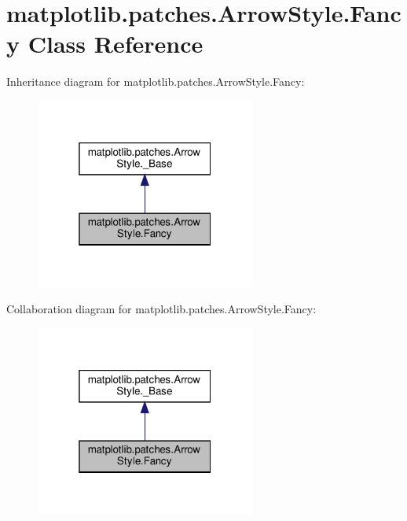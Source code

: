 \hypertarget{classmatplotlib_1_1patches_1_1ArrowStyle_1_1Fancy}{}\section{matplotlib.\+patches.\+Arrow\+Style.\+Fancy Class Reference}
\label{classmatplotlib_1_1patches_1_1ArrowStyle_1_1Fancy}


Inheritance diagram for matplotlib.\+patches.\+Arrow\+Style.\+Fancy\+:
\nopagebreak
\begin{figure}[H]
\begin{center}
\leavevmode
\includegraphics[width=205pt]{classmatplotlib_1_1patches_1_1ArrowStyle_1_1Fancy__inherit__graph}
\end{center}
\end{figure}


Collaboration diagram for matplotlib.\+patches.\+Arrow\+Style.\+Fancy\+:
\nopagebreak
\begin{figure}[H]
\begin{center}
\leavevmode
\includegraphics[width=205pt]{classmatplotlib_1_1patches_1_1ArrowStyle_1_1Fancy__coll__graph}
\end{center}
\end{figure}
